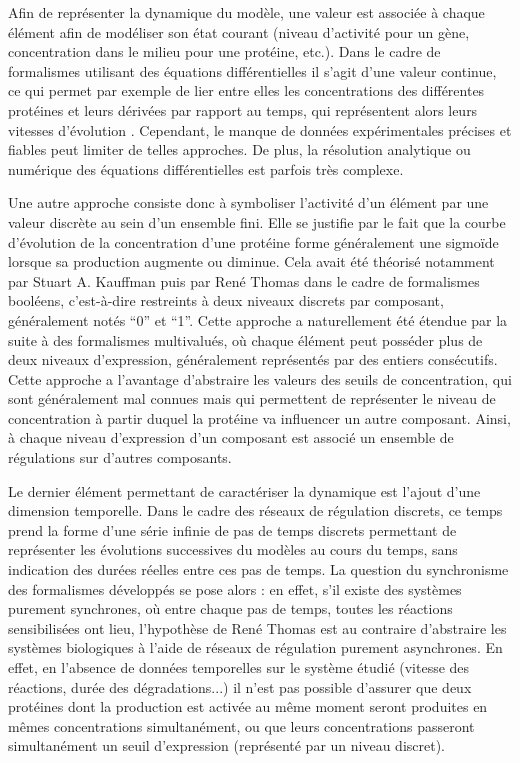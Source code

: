Afin de représenter la dynamique du modèle,
une valeur est associée à chaque élément afin de modéliser
son état courant
(niveau d'activité pour un gène,
concentration dans le milieu pour une protéine, etc.).
Dans le cadre de formalismes utilisant des équations différentielles
il s'agit d'une valeur continue,
ce qui permet par exemple de lier entre elles
les concentrations des différentes protéines et leurs dérivées par rapport au temps,
qui représentent alors leurs vitesses d'évolution \cite{tyson1978dynamics}.
Cependant, le manque de données expérimentales précises et fiables peut limiter de telles
approches.
De plus, la résolution analytique ou numérique des équations différentielles est parfois
très complexe.

Une autre approche consiste donc à symboliser l'activité d'un élément par
une valeur discrète au sein d'un ensemble fini.
Elle se justifie par le fait que la courbe d'évolution de la concentration
d'une protéine forme généralement une sigmoïde lorsque sa production augmente ou diminue.
Cela avait été théorisé notamment par Stuart A. Kauffman puis par René Thomas
\cite{kauffman69,Thomas73}
dans le cadre de formalismes booléens,
c'est-à-dire restreints à deux niveaux discrets par composant, généralement notés “0” et “1”.
Cette approche a naturellement été étendue par la suite à des formalismes multivalués,
où chaque élément peut posséder plus de deux niveaux d'expression,
généralement représentés par des entiers consécutifs.
Cette approche a l'avantage d'abstraire les valeurs des seuils de concentration,
qui sont généralement mal connues
mais qui permettent de représenter le niveau de concentration
à partir duquel la protéine va influencer un autre composant.
Ainsi, à chaque niveau d'expression d'un composant est associé un ensemble de régulations
sur d'autres composants.

Le dernier élément permettant de caractériser la dynamique est l'ajout d'une
dimension temporelle.
Dans le cadre des réseaux de régulation discrets, ce temps prend la forme d'une série
infinie de pas de temps discrets permettant de représenter les évolutions
successives du modèles au cours du temps, sans indication des durées réelles
entre ces pas de temps.
La question du synchronisme des formalismes développés se pose alors :
en effet, s'il existe des systèmes purement synchrones, où entre chaque pas de temps,
toutes les réactions sensibilisées ont lieu,
l'hypothèse de René Thomas \cite{Thomas73}
est au contraire d'abstraire les systèmes biologiques à l'aide
de réseaux de régulation purement asynchrones.
En effet, en l'absence de données temporelles sur le système étudié
(vitesse des réactions, durée des dégradations...)
il n'est pas possible d'assurer que deux protéines dont la production est activée au même moment
seront produites en mêmes concentrations simultanément,
ou que leurs concentrations passeront simultanément
un seuil d'expression (représenté par un niveau discret).

